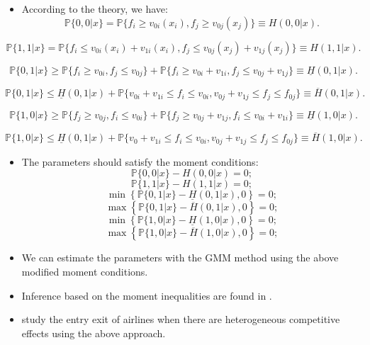 \documentclass[
]{book}
\providecommand{\tightlist}{%
  \setlength{\itemsep}{0pt}\setlength{\parskip}{0pt}}
\begin{document}
\begin{itemize}
\tightlist
\item
  According to the theory, we have:
  \[
  \mathbb{P}\{0, 0|x\} = \mathbb{P}\{f_{i} \ge v_{0i}(x_{i}), f_{j} \ge v_{0j}(x_{j})\} \equiv H(0, 0|x).
  \]
\end{itemize}

\[
\mathbb{P}\{1, 1|x\} = \mathbb{P}\{f_{i} \le v_{0i}(x_{i}) + v_{1i}(x_{i}), f_{j} \le v_{0j}(x_{j}) + v_{1j}(x_{j}) \} \equiv H(1, 1|x).
\]

\[
\mathbb{P}\{0, 1|x\} \ge \mathbb{P}\{f_{i} \ge v_{0i}, f_{j} \le v_{0j}\} + \mathbb{P}\{f_{i} \ge v_{0i} + v_{1i}, f_{j} \le v_{0j} + v_{1j}\} \equiv \underline{H}(0, 1|x).
\]

\[
\mathbb{P}\{0, 1|x\} \le \underline{H}(0, 1|x) + \mathbb{P}\{v_{0i} + v_{1i} \le f_{i} \le v_{0i}, v_{0j} + v_{1j} \le f_{j} \le f_{0j}\} \equiv \overline{H}(0, 1|x).
\]

\[
\mathbb{P}\{1, 0|x\} \ge \mathbb{P}\{f_{j} \ge v_{0j}, f_{i} \le v_{0i}\} + \mathbb{P}\{f_{j} \ge v_{0j} + v_{1j}, f_{i} \le v_{0i} + v_{1i}\} \equiv \underline{H}(1, 0|x).
\]

\[
\mathbb{P}\{1, 0|x\} \le \underline{H}(0, 1|x) + \mathbb{P}\{v_{0} + v_{1i} \le f_{i} \le v_{0i}, v_{0j} + v_{1j} \le f_{j} \le f_{0j}\} \equiv \overline{H}(1, 0|x).
\]

\begin{itemize}
\tightlist
\item
  The parameters should satisfy the moment conditions:
  \[
  \mathbb{P}\{0, 0|x\} - H(0, 0|x) = 0;
  \]
  \[
  \mathbb{P}\{1, 1|x\} - H(1, 1|x) = 0;
  \]
  \[
  \min\left\{\mathbb{P}\{0, 1|x\} - \underline{H}(0, 1|x), 0\right\} = 0;
  \]
  \[
  \max\left\{\mathbb{P}\{0, 1|x\} - \overline{H}(0, 1|x), 0\right\} = 0;
  \]
  \[
  \min\left\{\mathbb{P}\{1, 0|x\} - \underline{H}(1, 0|x), 0\right\} = 0;
  \]
  \[
  \max\left\{\mathbb{P}\{1, 0|x\} - \overline{H}(1, 0|x), 0\right\} = 0;
  \]
\item
  We can estimate the parameters with the GMM method using the above modified moment conditions.
\item
  Inference based on the moment inequalities are found in \citet{andrewsInferenceParametersDefined2010}.
\item
  \citet{cilibertoMarketStructureMultiple2009} study the entry exit of airlines when there are heterogeneous competitive effects using the above approach.
\end{itemize}
\end{document}
